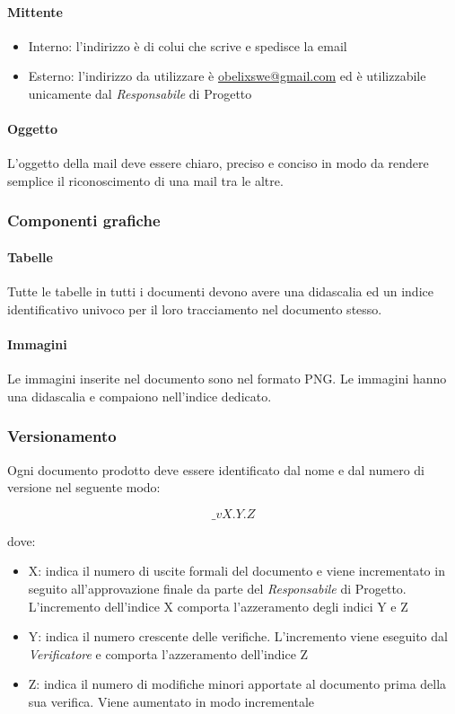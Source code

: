 \paragraph{Mittente}
\begin{itemize}
\item Interno: l'indirizzo è di colui che scrive e spedisce la email
\item Esterno: l'indirizzo da utilizzare è \href{mailto:obelixswe@gmail.com}{obelixswe@gmail.com} ed è utilizzabile unicamente dal  \emph{Responsabile}  di Progetto
\end{itemize}
\paragraph{Oggetto}

L'oggetto della mail deve essere chiaro, preciso e conciso in modo da rendere semplice il riconoscimento di una mail tra le altre.


\subsubsection{Componenti grafiche}

\paragraph{Tabelle }

Tutte le tabelle in tutti i documenti devono avere una didascalia ed
un indice identificativo univoco per il loro tracciamento nel
documento stesso. 

\paragraph{Immagini }

Le immagini inserite nel documento sono nel formato PNG. Le immagini hanno una didascalia e compaiono nell'indice dedicato.

\subsubsection{Versionamento}

Ogni documento prodotto deve essere identificato dal nome e dal numero di versione nel seguente modo:

$$ \_vX.Y.Z $$



dove:
\begin{itemize}
\item  X: indica il numero di uscite formali del documento e viene incrementato in seguito all'approvazione finale da parte del  \emph{Responsabile}  di Progetto.
L'incremento dell'indice X comporta l'azzeramento degli indici Y e Z

\item  Y: indica il numero crescente delle verifiche. L'incremento viene eseguito dal  \emph{Verificatore}  e comporta l'azzeramento dell'indice Z

\item  Z: indica il numero di modifiche minori apportate al documento prima della sua verifica. Viene aumentato in modo incrementale
\end{itemize}

